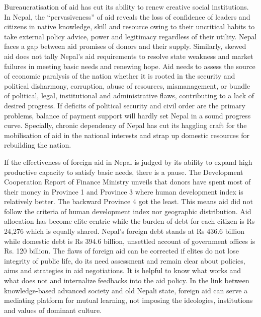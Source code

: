 \documentclass[
  openany]{book}
\begin{document}
Bureaucratisation of aid has cut its ability to renew creative social institutions. In Nepal, the ``pervasiveness'' of aid reveals the loss of confidence of leaders and citizens in native knowledge, skill and resource owing to their uncritical habits to take external policy advice, power and legitimacy regardless of their utility. Nepal faces a gap between aid promises of donors and their supply. Similarly, skewed aid does not tally Nepal's aid requirements to resolve state weakness and market failures in meeting basic needs and renewing hope. Aid needs to assess the source of economic paralysis of the nation whether it is rooted in the security and political disharmony, corruption, abuse of resources, mismanagement, or bundle of political, legal, institutional and administrative flaws, contributing to a lack of desired progress. If deficits of political security and civil order are the primary problems, balance of payment support will hardly set Nepal in a sound progress curve. Specially, chronic dependency of Nepal has cut its haggling craft for the mobilisation of aid in the national interests and strap up domestic resources for rebuilding the nation.

If the effectiveness of foreign aid in Nepal is judged by its ability to expand high productive capacity to satisfy basic needs, there is a pause. The Development Cooperation Report of Finance Ministry unveils that donors have spent most of their money in Province 1 and Province 3 where human development index is relatively better. The backward Province 4 got the least. This means aid did not follow the criteria of human development index nor geographic distribution. Aid allocation has become elite-centric while the burden of debt for each citizen is Rs 24,276 which is equally shared. Nepal's foreign debt stands at Rs 436.6 billion while domestic debt is Rs 394.6 billion, unsettled account of government offices is Rs. 120 billion. The flaws of foreign aid can be corrected if elites do not lose integrity of public life, do its need assessment and remain clear about policies, aims and strategies in aid negotiations. It is helpful to know what works and what does not and internalize feedbacks into the aid policy. In the link between knowledge-based advanced society and old Nepali state, foreign aid can serve a mediating platform for mutual learning, not imposing the ideologies, institutions and values of dominant culture.
\end{document}

